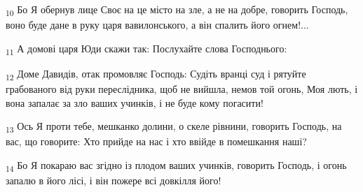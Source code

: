 \begin{tcolorbox}
\textsubscript{10} Бо Я обернув лице Своє на це місто на зле, а не на добре, говорить Господь, воно буде дане в руку царя вавилонського, а він спалить його огнем!...
\end{tcolorbox}
\begin{tcolorbox}
\textsubscript{11} А домові царя Юди скажи так: Послухайте слова Господнього:
\end{tcolorbox}
\begin{tcolorbox}
\textsubscript{12} Доме Давидів, отак промовляє Господь: Судіть вранці суд і рятуйте грабованого від руки переслідника, щоб не вийшла, немов той огонь, Моя лють, і вона запалає за зло ваших учинків, і не буде кому погасити!
\end{tcolorbox}
\begin{tcolorbox}
\textsubscript{13} Ось Я проти тебе, мешканко долини, о скеле рівнини, говорить Господь, на вас, що говорите: Хто прийде на нас і хто ввійде в помешкання наші?
\end{tcolorbox}
\begin{tcolorbox}
\textsubscript{14} Бо Я покараю вас згідно із плодом ваших учинків, говорить Господь, і огонь запалю в його лісі, і він пожере всі довкілля його!
\end{tcolorbox}
